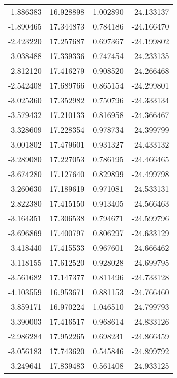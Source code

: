 \begin{tabular}{rrrr}
       -1.886383 &        16.928898 &    1.002890 & -24.133137 \\
       -1.890465 &        17.344873 &    0.784186 & -24.166470 \\
       -2.423220 &        17.257687 &    0.697367 & -24.199802 \\
       -3.038488 &        17.339336 &    0.747454 & -24.233135 \\
       -2.812120 &        17.416279 &    0.908520 & -24.266468 \\
       -2.542408 &        17.689766 &    0.865154 & -24.299801 \\
       -3.025360 &        17.352982 &    0.750796 & -24.333134 \\
       -3.579432 &        17.210133 &    0.816958 & -24.366467 \\
       -3.328609 &        17.228354 &    0.978734 & -24.399799 \\
       -3.001802 &        17.479601 &    0.931327 & -24.433132 \\
       -3.289080 &        17.227053 &    0.786195 & -24.466465 \\
       -3.674280 &        17.127640 &    0.829899 & -24.499798 \\
       -3.260630 &        17.189619 &    0.971081 & -24.533131 \\
       -2.822380 &        17.415150 &    0.913405 & -24.566463 \\
       -3.164351 &        17.306538 &    0.794671 & -24.599796 \\
       -3.696869 &        17.400797 &    0.806297 & -24.633129 \\
       -3.418440 &        17.415533 &    0.967601 & -24.666462 \\
       -3.118155 &        17.612520 &    0.928028 & -24.699795 \\
       -3.561682 &        17.147377 &    0.811496 & -24.733128 \\
       -4.103559 &        16.953671 &    0.881153 & -24.766460 \\
       -3.859171 &        16.970224 &    1.046510 & -24.799793 \\
       -3.390003 &        17.416517 &    0.968614 & -24.833126 \\
       -2.986284 &        17.952265 &    0.698231 & -24.866459 \\
       -3.056183 &        17.743620 &    0.545846 & -24.899792 \\
       -3.249641 &        17.839483 &    0.561408 & -24.933125 \\

\end{tabular}
